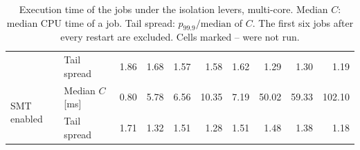 \begin{table}[ht]
{\begin{tabular}{ll|rrrr|rrrr}
 & Tail spread & 1.86 & 1.68 & 1.57 & 1.58 & 1.62 & 1.29 & 1.30 & 1.19 \\
\cmidrule{1-10}
\multirow[t]{2}{*}{SMT enabled} & Median $C$ [ms] & 0.80 & 5.78 & 6.56 & 10.35 & 7.19 & 50.02 & 59.33 & 102.10 \\
 & Tail spread & 1.71 & 1.32 & 1.51 & 1.28 & 1.51 & 1.48 & 1.38 & 1.18 \\
\bottomrule
\end{tabular}}
\caption{Execution time of the jobs under the isolation levers, multi-core. Median $C$: median CPU time of a job. Tail spread: $p_{99.9}/\mathrm{median}$ of $C$. The first six jobs after every restart are excluded. Cells marked -- were not run.}
\label{tab:rq1-exec-multi-core}
\end{table}
